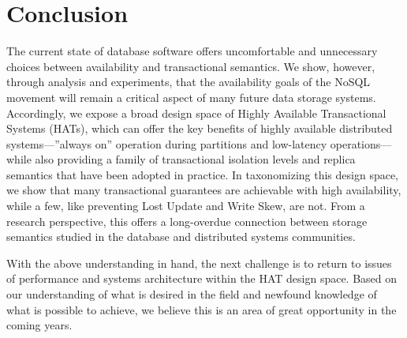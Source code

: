 
\section{Conclusion}
The current state of database software offers uncomfortable and
unnecessary choices between availability and transactional semantics.
We show, however, through analysis and experiments, that the
availability goals of the NoSQL movement will remain a critical aspect
of many future data storage systems. Accordingly, we expose a broad
design space of Highly Available Transactional Systems (HATs), which
can offer the key benefits of highly available distributed
systems---''always on'' operation during partitions and low-latency
operations---while also providing a family of transactional isolation
levels and replica semantics that have been adopted in practice.  In
taxonomizing this design space, we show that many transactional
guarantees are achievable with high availability, while a few, like
preventing Lost Update and Write Skew, are not. From a research
perspective, this offers a long-overdue connection between storage
semantics studied in the database and distributed systems communities.

With the above understanding in hand, the next challenge is to return
to issues of performance and systems architecture within the HAT
design space.  Based on our understanding of what is desired in the
field and newfound knowledge of what is possible to achieve, we
believe this is an area of great opportunity in the coming years.



